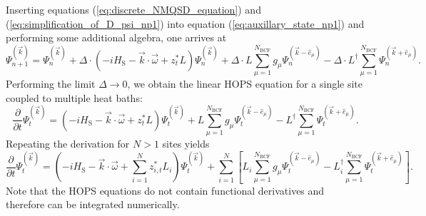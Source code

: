 Inserting equations (\ref{eq:discrete_NMQSD_equation}) and (\ref{eq:simplification_of_D_psi_np1}) into equation (\ref{eq:auxillary_state_np1}) and performing some
additional algebra, one arrives at
\begin{equation*}
    \Psi_{n+1}^{(\vec{k})} = \Psi_n^{(\vec{k})} + \Delta\cdot\left(
        -iH_\text{S} - \vec{k}\cdot\vec{\omega} + z_t^*L
    \right) \Psi_n^(\vec{k}) 
    + \Delta \cdot L\sum_{\mu=1}^{N_\text{BCF}}g_\mu\Psi_n^{(\vec{k}-\hat{e}_\mu)}
    - \Delta \cdot L^\dagger\sum_{\mu=1}^{N_\text{BCF}}\Psi_n^{(\vec{k}+\hat{e}_\mu)}.
\end{equation*}
Performing the limit $\Delta \rightarrow 0$, we obtain the linear HOPS equation for a single 
site coupled to multiple heat baths:
\begin{equation}
    \label{eq:linear_HOPS_single_site}
    \frac{\partial}{\partial t}\Psi_t^{(\vec{k})} = \left(
        -iH_\text{S} - \vec{k}\cdot\vec{\omega} + z_t^*L
    \right) \Psi_t^{(\vec{k})}
    + L\sum_{\mu=1}^{N_\text{BCF}}g_\mu\Psi_t^{(\vec{k}-\hat{e}_\mu)}
    - L^\dagger\sum_{\mu=1}^{N_\text{BCF}}\Psi_t^{(\vec{k}+\hat{e}_\mu)}.
\end{equation}
Repeating the derivation for $N>1$ sites yields
\begin{equation}
    \label{eq:linear_HOPS_multiple_sites}
    \frac{\partial}{\partial t}\Psi_t^{(\vec{k})} = \left(
        -iH_\text{S} - \vec{k}\cdot\vec{\omega} + \sum_{i=1}^{N} z_{i,t}^*L_i
    \right) \Psi_t^{(\vec{k})}
    + \sum_{i=1}^{N} \left[
        L_i\sum_{\mu=1}^{N_\text{BCF}}g_\mu\Psi_t^{(\vec{k}-\hat{e}_\mu)}
        - L_i^\dagger\sum_{\mu=1}^{N_\text{BCF}}\Psi_t^{(\vec{k}+\hat{e}_\mu)}
    \right].
\end{equation}
Note that the HOPS equations do not contain functional derivatives
and therefore can be integrated numerically.